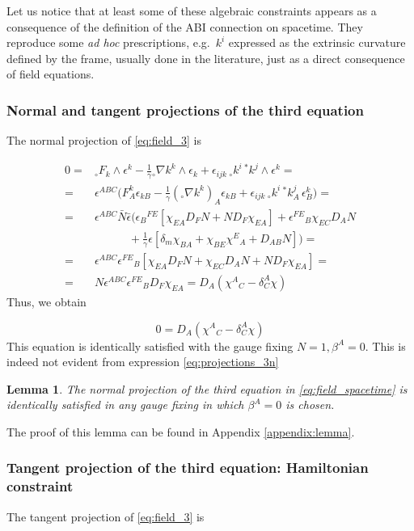 \documentclass[a4paper, 11pt]{article}
\def\be{\beta}
\def\ga{\gamma}
\def\de{\delta}
\def\ep{\epsilon}
\def\na{\nabla}
\newtheorem{lma}[equation]{Lemma}
\def\we{\wedge}
\def\tp#1{{}^\ast\!#1}
\def\np#1{{}_\circ#1}
\numberwithin{equation}{section}
\begin{document}
Let us notice that at least some of these algebraic constraints appears as a consequence of the definition of the ABI connection on spacetime.
They reproduce some {\it ad hoc} prescriptions, e.g.~$k^i$ expressed as the extrinsic curvature defined by the frame, usually done in the literature, just as a direct consequence of field equations.


\subsubsection{Normal and tangent projections of the third equation}


The normal projection of \eqref{eq:field_3} is 

\begin{align*}
    0 =&  \np F_k \we \ep^k - \tfrac 1 \ga \np \na k^k \we \ep_k +  \ep_{ijk}\, \np k^i \, \tp k^j \we \ep^k =  \\ 
    =& \ep^{ABC}\Big(F^k_A \ep_{kB} - \tfrac 1 \ga  (\np\na k^k)_A \ep_{kB} + \ep_{ijk} \, \np k^i \, \tp k^j_A \, \ep^k_B \Big) =  \\ 
    =& \ep^{ABC}\bar N\bar \ep \Big( \ep_{B}{}^{FE} \left[\chi_{EA} D_F N + ND_F\chi_{EA}\right] +  \ep^{FE}{}_{B} \chi_{EC}  D_AN   \\ 
    &\quad\qquad +  \tfrac 1 \ga \ep \left[\de_m \chi_{BA} + \chi_{BE} \chi^E{}_A + D_{AB}N\right] \Big) = \\
    =& \ep^{ABC}\ep^{FE}{}_{B}\left[\chi_{EA} D_F N + \chi_{EC} D_A N + ND_F\chi_{EA}\right] = \\ 
    =& N \ep^{ABC}\ep^{FE}{}_{B}D_F\chi_{EA}  = D_A(\chi^A{}_C - \de^A_C \chi)
\end{align*}
Thus, we obtain 

\begin{equation}
\boxed{0 = D_A(\chi^A{}_C - \de^A_C \chi)}
\label{eq:projections_3n}
\end{equation}
This equation is identically satisfied with the gauge fixing $N = 1, \be^A = 0$. This is indeed not evident from expression \eqref{eq:projections_3n}

\begin{lma}
    \label{lma:eq_3n_gauge}
    The normal projection of the third equation in \eqref{eq:field_spacetime} is identically satisfied in any gauge fixing in which $\be^A = 0$ is chosen.
\end{lma}
The proof of this lemma can be found in Appendix \ref{appendix:lemma}.

\subsubsection{Tangent projection of the third equation: Hamiltonian constraint}
The tangent projection of \eqref{eq:field_3} is
\end{document}
